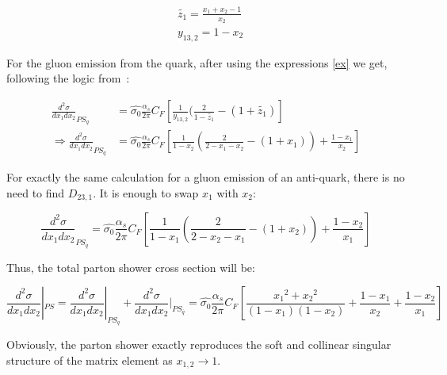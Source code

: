\begin{equation}
\begin{split}
&\tilde{z_1}=\frac{x_1+x_2-1}{x_2}\\
&y_{13,2} =1-x_2
\label{ex}
\end{split}
\end{equation}



For the gluon emission from the quark, after using the expressions \ref{ex} we get, following the logic from~\cite{Schumann:2007mg}:

\begin{equation}
\begin{split}
\frac{d^2 \sigma}{dx_1 dx_2}_{PS_q}&= \hat{\sigma_0}
\frac{\alpha_s}{2\pi} C_F [\frac{1}{y_{13,2}} (\frac{2}{1-\tilde{z_1}}-(1+\tilde{z_1})]\\
\Rightarrow \frac{d^2 \sigma}{dx_1 dx_2}_{PS_q}&= \hat{\sigma_0}
\frac{\alpha_s}{2\pi} C_F [\frac{1}{1-x_2} (\frac{2}{2-x_1-x_2}-(1+x_1))+\frac{1-x_1}{x_2}]
\end{split}
\end{equation}




For exactly the same calculation for a gluon emission of an anti-quark, there is no need to find $ D_{23,1} $. It is enough to swap $ x_1 $ with $ x_2 $:

\begin{equation}
\frac{d^2 \sigma}{dx_1 dx_2}_{PS_{\bar{q}}}= \hat{\sigma_0}
\frac{\alpha_s}{2\pi} C_F [\frac{1}{1-x_1} (\frac{2}{2-x_2-x_1}-(1+x_2))+\frac{1-x_2}{x_1}]
\end{equation}



Thus, the total parton shower cross section will be:

\begin{equation}
\frac{d^2 \sigma}{dx_1 dx_2}|_{PS}=\frac{d^2 \sigma}{dx_1 dx_2}|_{PS_q}+\frac{d^2 \sigma}{dx_1 dx_2}|_{PS_{\bar{q}}}= \hat{\sigma_0}
\frac{\alpha_s}{2\pi} C_F [\frac{{x_1}^2+{x_2}^2}{(1-x_1)(1-x_2)}+\frac{1-x_1}{x_2}+\frac{1-x_2}{x_1}]
\end{equation}

Obviously, the parton shower exactly reproduces the soft and collinear singular structure of the matrix element as $ x_{1,2} \rightarrow 1 $.


